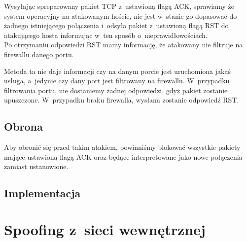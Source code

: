 \documentclass[a4paper,12pt]{book}
\begin{document}
			Wysyłając spreparowany pakiet TCP z~ustawioną flagą ACK, sprawiamy że system operacyjny na atakowanym hoście, nie jest w~stanie go dopasować do żadnego istniejącego połączenia i~odsyła pakiet z~ustawioną flagą RST do atakującego hosta informując w~ten sposób o~nieprawidłowościach.\\
			Po otrzymaniu odpowiedzi RST mamy informację, że atakowany nie filtruje na firewallu danego portu.

			Metoda ta nie daje informacji czy na danym porcie jest uruchomiona jakaś usługa, a~jedynie czy dany port jest filtrowany na firewallu.
			W~przypadku filtrowania portu, nie dostaniemy żadnej odpowiedzi, gdyż pakiet zostanie upuszczone.
			W~przypadku braku firewalla, wysłana zostanie odpowiedź RST.
		\subsection{Obrona}
			Aby obronić się przed takim atakiem, powinniśmy blokować wszystkie pakiety mające ustawioną flagą ACK oraz będące interpretowane jako nowe połączenia zamiast ustanowione.
		\subsection{Implementacja}
			\footnotesize
			\normalsize
	\section{Spoofing z~sieci wewnętrznej}
\end{document}
